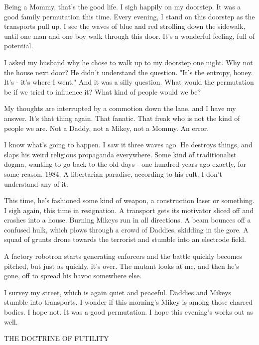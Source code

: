 \documentclass{amsbook}
\begin{document}
Being a Mommy, that's the good life.  I sigh happily on my doorstep.  It was a good family permutation this time.  Every evening, I stand on this doorstep as the transports pull up.  I see the waves of blue and red strolling down the sidewalk, until one man and one boy walk through this door.  It's a wonderful feeling, full of potential.

I asked my husband why he chose to walk up to my doorstep one night. Why not the house next door?  He didn't understand the question.  "It's the entropy, honey.  It's - it's where I went."  And it was a silly question.  What would the permutation be if we tried to influence it?  What kind of people would we be?

My thoughts are interrupted by a commotion down the lane, and I have my answer.  It's that thing again.  That fanatic.  That freak who is not the kind of people we are.  Not a Daddy, not a Mikey, not a Mommy.  An error.

I know what's going to happen.  I saw it three waves ago.  He destroys things, and slaps his weird religious propaganda everywhere.  Some kind of traditionalist dogma, wanting to go back to the old days - one hundred years ago exactly, for some reason.  1984.  A libertarian paradise, according to his cult.  I don't understand any of it.

This time, he's fashioned some kind of weapon, a construction laser or something.  I sigh again, this time in resignation.  A transport gets its motivator sliced off and crashes into a house.  Burning Mikeys run in all directions.  A beam bounces off a confused hulk, which plows through a crowd of Daddies, skidding in the gore.  A squad of grunts drone towards the terrorist and stumble into an electrode field.

A factory robotron starts generating enforcers and the battle quickly becomes pitched, but just as quickly, it's over.  The mutant looks at me, and then he's gone, off to spread his havoc somewhere else.

I survey my street, which is again quiet and peaceful.  Daddies and Mikeys stumble into transports.  I wonder if this morning's Mikey is among those charred bodies.  I hope not.  It was a good permutation.  I hope this evening's works out as well.

\clearpage
    {\ROBOFONTx THE DOCTRINE OF FUTILITY}
\vskip 36pt
\end{document}
